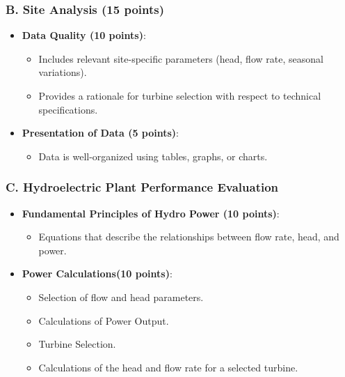 \documentclass[11pt]{article}
\begin{document}
\subsubsection*{B. Site Analysis (15 points)}
\begin{itemize}
    \item \textbf{Data Quality (10 points)}:
    \begin{itemize}
        \item Includes relevant site-specific parameters (head, flow rate, seasonal variations).
        \item Provides a rationale for turbine selection with respect to technical specifications.
    \end{itemize}
    \item \textbf{Presentation of Data (5 points)}:
    \begin{itemize}
        \item Data is well-organized using tables, graphs, or charts.
    \end{itemize}
\end{itemize}

\subsubsection*{C. Hydroelectric Plant Performance Evaluation}
\begin{itemize}
     \item \textbf{Fundamental Principles of Hydro Power (10 points)}:
    \begin{itemize}
        \item Equations that describe the relationships between flow rate, head, and power.
    \end{itemize}
    \item \textbf{Power Calculations(10 points)}:
    \begin{itemize}
        \item Selection of flow and head parameters.
        \item Calculations of Power Output.
        \item Turbine Selection.
        \item Calculations of the head and flow rate for a selected turbine.
    \end{itemize}
\end{itemize}
\end{document}
